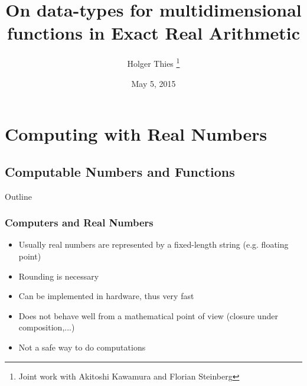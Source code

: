 \documentclass[handout,xcolor=pdftex,dvipsnames,table]{beamer}
\title[data-types for multidimensional functions]{On data-types for multidimensional functions in Exact Real Arithmetic
}
\author[ H. Thies]{
		Holger Thies \footnote{Joint work with Akitoshi Kawamura and Florian Steinberg}
}
\institute[The University of Tokyo]{
  The University of Tokyo
}
\begin{document}
\date{May 5, 2015}
\frame{
\titlepage
}
\section{Computing with Real Numbers}
\subsection{Computable Numbers and Functions}
\begin{frame}[t]{Outline}
 \tableofcontents 
\end{frame}
\begin{frame}
  \frametitle{Computers and Real Numbers}
  \begin{itemize}[<+->]
    \item Usually real numbers are represented by a fixed-length string (e.g. floating point)
      \item Rounding is necessary
    \item Can be implemented in hardware, thus very fast
     \item Does not behave well from a mathematical point of view (closure under composition,...) 
       \item Not a safe way to do computations
    \end{itemize}
  \end{frame}
\end{document}

